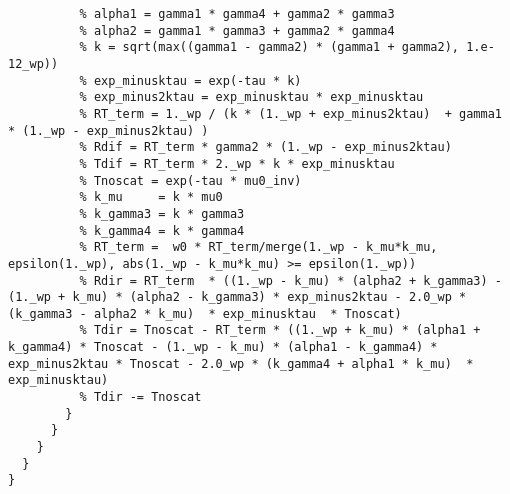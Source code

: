 \begin{lstlisting}[style=default]
          % Rest of the program not represented as HIR
          % alpha1 = gamma1 * gamma4 + gamma2 * gamma3 
          % alpha2 = gamma1 * gamma3 + gamma2 * gamma4 
          % k = sqrt(max((gamma1 - gamma2) * (gamma1 + gamma2), 1.e-12_wp))
          % exp_minusktau = exp(-tau * k)
          % exp_minus2ktau = exp_minusktau * exp_minusktau
          % RT_term = 1._wp / (k * (1._wp + exp_minus2ktau)  + gamma1 * (1._wp - exp_minus2ktau) )
          % Rdif = RT_term * gamma2 * (1._wp - exp_minus2ktau)
          % Tdif = RT_term * 2._wp * k * exp_minusktau
          % Tnoscat = exp(-tau * mu0_inv)
          % k_mu     = k * mu0
          % k_gamma3 = k * gamma3
          % k_gamma4 = k * gamma4
          % RT_term =  w0 * RT_term/merge(1._wp - k_mu*k_mu, epsilon(1._wp), abs(1._wp - k_mu*k_mu) >= epsilon(1._wp))
          % Rdir = RT_term  * ((1._wp - k_mu) * (alpha2 + k_gamma3) -  (1._wp + k_mu) * (alpha2 - k_gamma3) * exp_minus2ktau - 2.0_wp * (k_gamma3 - alpha2 * k_mu)  * exp_minusktau  * Tnoscat)
          % Tdir = Tnoscat - RT_term * ((1._wp + k_mu) * (alpha1 + k_gamma4) * Tnoscat - (1._wp - k_mu) * (alpha1 - k_gamma4) * exp_minus2ktau * Tnoscat - 2.0_wp * (k_gamma4 + alpha1 * k_mu)  * exp_minusktau)
          % Tdir -= Tnoscat
        }   
      }
    }
  }
}
\end{lstlisting}
